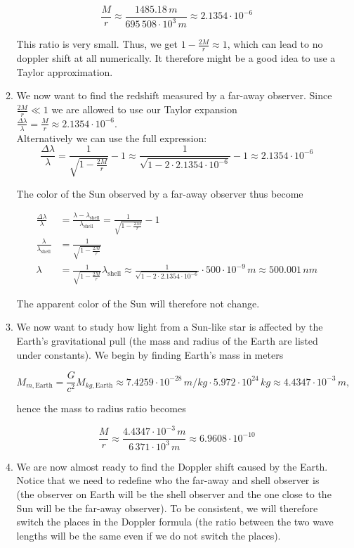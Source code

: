 \documentclass[a4paper,10pt,english]{article}
\begin{document}
\begin{enumerate}
\begin{enumerate}
\[\frac{M}{r}\approx\frac{1485.18\,m}{695\,508\cdot10^{3}\,m}\approx2.1354\cdot10^{-6}\]

This ratio is very small. Thus, we get $1-\frac{2M}{r}\approx1$, which can lead to no doppler shift at all numerically. It therefore might be a good idea to use a Taylor approximation.

\item We now want to find the redshift measured by a far-away observer. Since $\frac{2M}{r}\ll 1$ we are allowed to use our Taylor expansion $\frac{\Delta \lambda}{\lambda}=\frac{M}{r}\approx2.1354\cdot10^{-6}$.
\\
Alternatively we can use the full expression:
\begin{equation*}
\frac{\Delta \lambda}{\lambda}=\frac{1}{\sqrt{1-\frac{2M}{r}}}-1\approx\frac{1}{\sqrt{1-2\cdot2.1354\cdot10^{-6}}}-1\approx2.1354\cdot10^{-6}
\end{equation*}
  
The color of the Sun observed by a far-away observer thus become

\begin{align*}
\frac{\Delta \lambda}{\lambda}&=\frac{\lambda-\lambda_{\text{shell}}}{\lambda_{\text{shell}}}=\frac{1}{\sqrt{1-\frac{2M}{r}}}-1\\
\frac{\lambda}{\lambda_{\text{shell}}}&=\frac{1}{\sqrt{1-\frac{2M}{r}}}\\
\lambda&=\frac{1}{\sqrt{1-\frac{2M}{r}}}\lambda_{\text{shell}}\approx\frac{1}{\sqrt{1-2\cdot2.1354\cdot10^{-6}}}\cdot500\cdot10^{-9}\,m\approx500.001\,nm
\end{align*}

The apparent color of the Sun will therefore not change.
  
\item We now want to study how light from a Sun-like star is affected by the Earth's gravitational pull (the mass and radius of the Earth are listed under constants). We begin by finding Earth's mass in meters 

\[M_{m,\text{Earth}}=\frac{G}{c^{2}}M_{kg,\text{Earth}}\approx7.4259\cdot10^{-28}\,m/kg\cdot5.972\cdot10^{24}\,kg\approx4.4347\cdot10^{-3}\,m,\]

hence the mass to radius ratio becomes

\[\frac{M}{r}\approx\frac{4.4347\cdot10^{-3}\,m}{6\,371\cdot10^{3}\,m}\approx6.9608\cdot10^{-10}\]
  
\item We are now almost ready to find the Doppler shift caused by the Earth. Notice that we need to redefine who the far-away and shell observer is (the observer on Earth will be the shell observer and the one close to the Sun will be the far-away observer). To be consistent, we will therefore switch the places in the Doppler formula (the ratio between the two wave lengths will be the same even if we do not switch the places).


\end{enumerate}
\end{enumerate}
\end{document}
